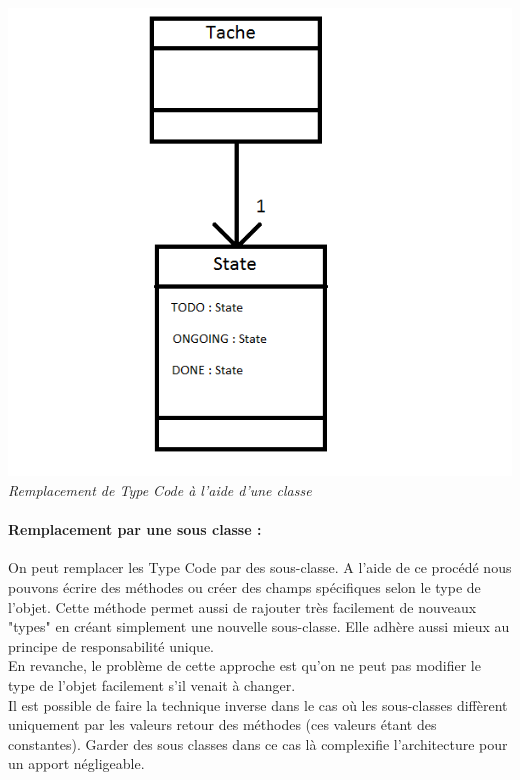 \documentclass[a4paper,twoside,12pt,openright]{report}
\begin{document}
\begin{center}
\includegraphics[scale=1]{Image/TypeCodeClasse.png}\\
\itshape{Remplacement de Type Code à l'aide d'une classe}
\end{center}

\paragraph{Remplacement par une sous classe :}
On peut remplacer les Type Code par des sous-classe. A l'aide de ce procédé nous pouvons écrire des méthodes ou créer des champs spécifiques selon le type de l'objet. Cette méthode permet aussi de rajouter très facilement de nouveaux "types" en créant simplement une nouvelle sous-classe.
Elle adhère aussi mieux au principe de responsabilité unique.\\
En revanche, le problème de cette approche est qu'on ne peut pas modifier le type de l'objet facilement s'il venait à changer.\\
Il est possible de faire la technique inverse dans le cas où les sous-classes diffèrent uniquement par les valeurs retour des méthodes (ces valeurs étant des constantes). Garder des sous classes dans ce cas là complexifie l'architecture pour un apport négligeable.
\end{document}
